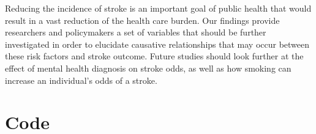\documentclass[11pt,]{article}
\begin{document}
Reducing the incidence of stroke is an important goal of public health
that would result in a vast reduction of the health care burden. Our
findings provide researchers and policymakers a set of variables that
should be further investigated in order to elucidate causative
relationships that may occur between these risk factors and stroke
outcome. Future studies should look further at the effect of mental
health diagnosis on stroke odds, as well as how smoking can increase an
individual's odds of a stroke.




\newpage
\singlespacing 


\appendix
\section{Code}
%
%
%
\end{document}

